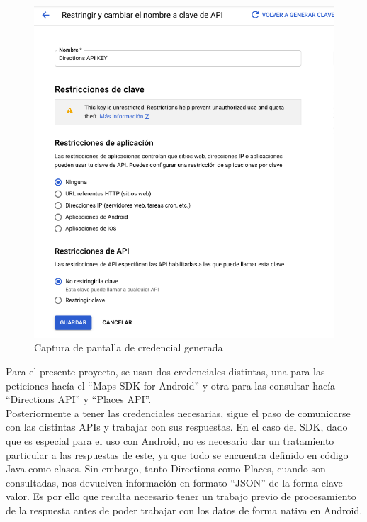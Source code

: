 \begin{figure}[H]
	\centering
	\includegraphics[scale=.4]{Capitulo5/software/submodulos/aplicacion/images/6}
	\caption{Captura de pantalla de credencial generada}
	\label{fig:consola_google6}
\end{figure}

Para el presente proyecto, se usan dos credenciales distintas, una para las peticiones hacía el ``Maps SDK for Android'' y otra para las consultar hacía ``Directions API'' y ``Places API''.\\

Posteriormente a tener las credenciales necesarias, sigue el paso de comunicarse con las distintas APIs y trabajar con sus respuestas. En el caso del SDK, dado que es especial para el uso con Android, no es necesario dar un tratamiento particular a las respuestas de este, ya que todo se encuentra definido en código Java como clases. Sin embargo, tanto Directions como Places, cuando son consultadas, nos devuelven información en formato ``JSON'' de la forma clave-valor. Es por ello que resulta necesario tener un trabajo previo de procesamiento de la respuesta antes de poder trabajar con los datos de forma nativa en Android.\\

